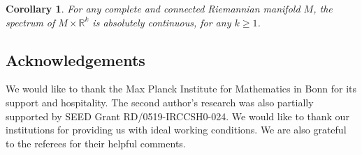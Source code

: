 \documentclass[pdftex]{sigma}
\numberwithin{equation}{section}
\newtheorem{Corollary}[Theorem]{Corollary}
\def\R{\mathbb R}
\begin{document}
\begin{Corollary}\label{eufac}
For any complete and connected Riemannian manifold $M$,
the spectrum of $M\times\R^k$ is absolutely continuous, for any $k\ge1$.
\end{Corollary}

\subsection*{Acknowledgements}

We would like to thank the Max Planck Institute for Mathematics in Bonn for its support and hospitality.
The second author’s research was also partially supported by SEED Grant RD/0519-IRCCSH0-024.
We would like to thank our institutions for providing us with ideal working conditions.
We are also grateful to the referees for their helpful comments.
\end{document}
